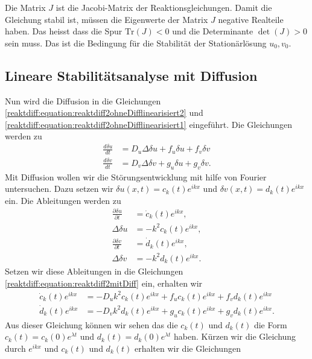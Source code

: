 Die Matrix \(J\) ist die Jacobi-Matrix der Reaktionsgleichungen.
Damit die Gleichung stabil ist, müssen die Eigenwerte der Matrix \(J\) negative Realteile haben.
Das heisst dass die Spur \(\text{Tr}(J) < 0\) und die Determinante \(\det(J) > 0\) sein muss.
Das ist die Bedingung für die Stabilität der Stationärlösung \(u_0, v_0\).

\subsection{Lineare Stabilitätsanalyse mit Diffusion
\label{reaktdiff:section:matheDiff}}
Nun wird die Diffusion in die Gleichungen \ref{reaktdiff:equation:reaktdiff2ohneDifflinearisiert2} und \ref{reaktdiff:equation:reaktdiff2ohneDifflinearisiert1} eingeführt.
Die Gleichungen werden zu
\begin{align}
    \label{reaktdiff:equation:reaktdiff2mitDiff}
    \frac{d \delta u}{dt} &= D_u \Delta \delta u + 
    f_u \delta u + f_v \delta v\\
    \frac{d \delta v}{dt} &= D_v \Delta \delta v + 
    g_u \delta u + g_v \delta v.
\end{align}
Mit Diffusion wollen wir die Störungsentwicklung mit hilfe von Fourier untersuchen.
Dazu setzen wir \(\delta u(x,t) = c_k(t) e^{ikx}\) und \(\delta v(x,t) = d_k(t) e^{ikx}\) ein.
Die Ableitungen werden zu
\begin{align*}
    \frac{\partial \delta u}{\partial t} &= \dot{c}_k(t) e^{ikx},\\
    \Delta \delta u &= -k^2 c_k(t) e^{ikx},\\
    \frac{\partial \delta v}{\partial t} &= \dot{d}_k(t) e^{ikx},\\
    \Delta \delta v &= -k^2 d_k(t) e^{ikx}.
\end{align*}
Setzen wir diese Ableitungen in die Gleichungen \ref{reaktdiff:equation:reaktdiff2mitDiff} ein, erhalten wir
\begin{align}
    \label{reaktdiff:equation:reaktdiff2mitDiffFourier}
    \dot{c}_k(t) e^{ikx} &= -D_u k^2 c_k(t) e^{ikx} + 
    f_u c_k(t) e^{ikx} + f_v d_k(t) e^{ikx}\\
    \dot{d}_k(t) e^{ikx} &= -D_v k^2 d_k(t) e^{ikx} + 
    g_u c_k(t) e^{ikx} + g_v d_k(t) e^{ikx}.
\end{align}
Aus dieser Gleichung können wir sehen das die \(c_k(t)\) und \(d_k(t)\) die Form \(c_k(t) = c_k(0) e^{\lambda t}\) und \(d_k(t) = d_k(0) e^{\lambda t}\) haben.
Kürzen wir die Gleichung durch \(e^{ikx}\) und \(c_k(t)\) und \(d_k(t)\) erhalten wir die Gleichungen

